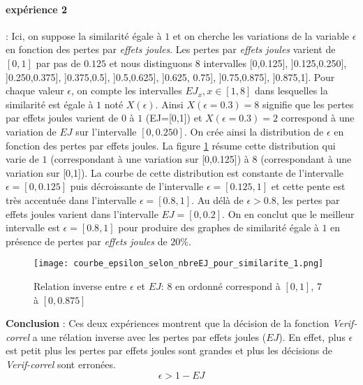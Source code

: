 \paragraph{exp\'erience 2} :
Ici, on suppose la similarit\'e \'egale \`a $1$ et on cherche les variations de la variable $\epsilon$ en fonction des pertes par {\em effets joules}. 
Les pertes par {\em effets joules} varient de $[0,1]$ par pas de $0.125$ et nous distinguons $8$ intervalles [0,0.125], ]0.125,0.250], ]0.250,0.375], ]0.375,0.5], ]0.5,0.625], ]0.625, 0.75], ]0.75,0.875], ]0.875,1]. 
Pour chaque valeur $\epsilon$, on compte les intervalles $EJ_x, x \in [1,8]$ dans lesquelles la similarit\'e est \'egale \`a $1$ not\'e $X(\epsilon)$. Ainsi $X(\epsilon=0.3) = 8$ signifie que  les pertes par effets joules varient de $0$ \`a $1$ (EJ=[0,1]) et $X(\epsilon=0.3) = 2$ correspond \`a une variation de $EJ$ sur l'intervalle $[0,0.250]$.
On cr\'ee ainsi la distribution de $\epsilon$ en fonction des pertes par effets joules.
La figure \ref{courbeEpsilonEJ}  r\'esume cette distribution qui varie de $1$ (correspondant \`a une variation sur [0,0.125]) \`a $8$ (correspondant \`a une variation sur [0,1]).
La courbe de cette distribution est constante de l'intervalle $\epsilon = [0,0.125]$ puis  d\'ecroissante de l'intervalle $\epsilon =[0.125,1]$ et cette pente est tr\`es accentu\'ee dans l'intervalle $\epsilon = [0.8, 1]$. 
Au d\'el\`a  de $\epsilon > 0.8$, les pertes par effets joules varient dans l'intervalle $EJ=[0,0.2]$.
On en conclut que le meilleur intervalle est $\epsilon = [0.8, 1]$ pour produire des graphes de similarit\'e \'egale \`a $1$ en pr\'esence de pertes par {\em effets joules} de $20\%$.
\newline
\begin{figure}
\centering
\texttt{[image: courbe\_epsilon\_selon\_nbreEJ\_pour\_similarite\_1.png]}
\caption{ Relation inverse entre $\epsilon$ et $EJ$: $8$ en ordonn\'e correspond \`a $[0,1]$, $7$ \`a $[0, 0.875]$ }
\label {courbeEpsilonEJ}
\end{figure}
\FloatBarrier

{\bf Conclusion} : Ces deux exp\'eriences montrent que la d\'ecision de la fonction {\em Verif-correl}  a une r\'elation inverse avec les pertes par effets joules ($EJ$). En effet, plus $\epsilon$ est petit plus les pertes par effets joules sont grandes et plus les d\'ecisions de {\em Verif-correl} sont erron\'ees.
\begin{equation}
	\epsilon > 1 - EJ
\end{equation}
